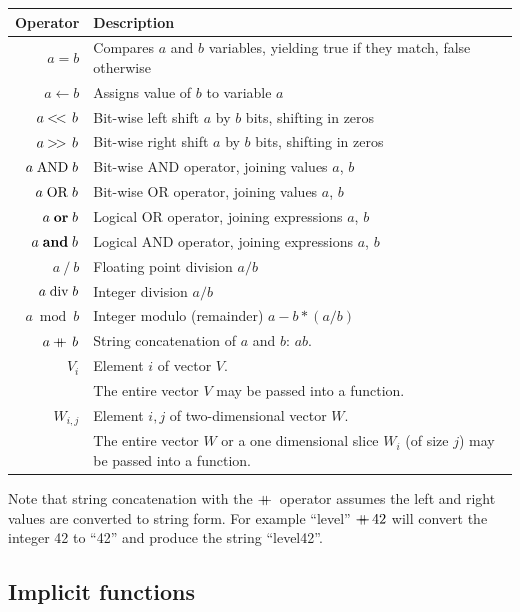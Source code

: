 \documentclass[a4paper]{article}
\begin{document}
\begin{tabular}{rl}
\hline
\textbf{Operator} & \textbf{Description}\\
\hline
$a = b$       & Compares $a$ and $b$ variables, yielding true if they match, false otherwise\\
$a \gets b$   & Assigns value of $b$ to variable $a$\\
$a \mathbin{<\mkern-3mu<\,} b$ & Bit-wise left shift $a$ by $b$ bits, shifting in zeros \\
$a \mathbin{>\mkern-3mu>\,} b$ & Bit-wise right shift $a$ by $b$ bits, shifting in zeros \\
$a \bitand b$ & Bit-wise AND operator, joining values $a$, $b$\\
$a \bitor b$  & Bit-wise OR operator, joining values $a$, $b$\\
$a \logor b$  & Logical OR operator, joining expressions $a$, $b$\\
$a \logand b$ & Logical AND operator, joining expressions $a$, $b$\\
$a\ /\ b$     & Floating point division $a/b$\\
$a \bdiv b$   & Integer division $a/b$\\
$a \bmod b$   & Integer modulo (remainder) $a - b*(a/b)$\\
$a \mathbin{+\mkern-10mu+\,} b$ & String concatenation of $a$ and $b$: $ab$.\\
$V_i$         & Element $i$ of vector $V$.\\
              & The entire vector $V$ may be passed into a function.\\
$W_{i,j}$      & Element $i,j$ of two-dimensional vector $W$.\\
              & The entire vector $W$ or a one dimensional slice $W_i$ (of size $j$) may be passed into a function.\\
\hline
\end{tabular}

Note that string concatenation with the $\mathbin{+\mkern-10mu+\,}$ operator
assumes the left and right values are converted to string form.  For
example ``level'' $\mathbin{+\mkern-10mu+\,} 42$ will convert the integer 42 to ``42''
and produce the string ``level42''.

\subsection{Implicit functions}
\end{document}
